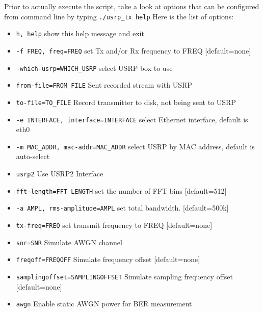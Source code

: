 \begin{enumerate}
	Prior to actually execute the script, take a look at options that can be configured from command line by typing\newline
	\texttt{./usrp\_tx \option help}\newline
	Here is the list of options:
	\begin{itemize}
 		\item  \texttt{h, \option help}            show this help message and exit
 		\item \texttt{-f FREQ, \option freq=FREQ}  set Tx and/or Rx frequency to FREQ [default=none]
		\item  \texttt{-which-usrp=WHICH\_USRP} select USRP box to use
		\item    \texttt{\option from-file=FROM\_FILE} Sent recorded stream with USRP
		\item    \texttt{\option to-file=TO\_FILE}     Record transmitter to disk, not being sent to USRP
		\item    \texttt{-e INTERFACE, \option interface=INTERFACE} select Ethernet interface, default is eth0
		\item   \texttt{-m MAC\_ADDR, \option mac-addr=MAC\_ADDR} select USRP by MAC address, default is auto-select
		\item    \texttt{\option usrp2}               Use USRP2 Interface
		\item    \texttt{\option fft-length=FFT\_LENGTH} set the number of FFT bins [default=512]
		\item   \texttt{-a AMPL, \option rms-amplitude=AMPL} set total bandwidth. [default=500k]
		\item      \texttt{\option tx-freq=FREQ}     set transmit frequency to FREQ [default=none]
		\item     \texttt{\option snr=SNR}           Simulate AWGN channel
		\item      \texttt{\option freqoff=FREQOFF}   Simulate frequency offset [default=none]
		\item     \texttt{\option samplingoffset=SAMPLINGOFFSET} Simulate sampling frequency offset [default=none]
		\item      \texttt{\option awgn}              Enable static AWGN power for BER measurement

\end{itemize}
\end{enumerate}
